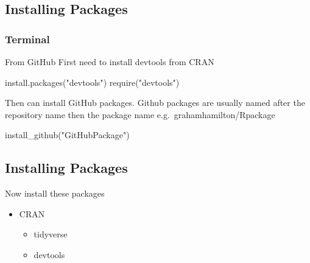 \documentclass[
  letterpaper,
  DIV=11,
  numbers=noendperiod,
  landscape]{scrartcl}
\newenvironment{Shaded}{\begin{snugshade}}{\end{snugshade}}
\newcommand{\FunctionTok}[1]{\textcolor[rgb]{0.28,0.35,0.67}{#1}}
\newcommand{\NormalTok}[1]{\textcolor[rgb]{0.00,0.23,0.31}{#1}}
\newcommand{\StringTok}[1]{\textcolor[rgb]{0.13,0.47,0.30}{#1}}
\begin{document}
\hypertarget{installing-packages-1}{%
\subsection{Installing Packages}\label{installing-packages-1}}

\hypertarget{terminal-1}{%
\subsubsection{Terminal}\label{terminal-1}}

From GitHub First need to install devtools from CRAN

\begin{Shaded}
\begin{Highlighting}[]
\FunctionTok{install.packages}\NormalTok{(}\StringTok{"devtools"}\NormalTok{)}
\FunctionTok{require}\NormalTok{(}\StringTok{"devtools"}\NormalTok{)}
\end{Highlighting}
\end{Shaded}

Then can install GitHub packages. Github packages are usually named
after the repository name then the package name
e.g.~grahamhamilton/Rpackage

\begin{Shaded}
\begin{Highlighting}[]
\FunctionTok{install\_github}\NormalTok{(}\StringTok{"GitHubPackage"}\NormalTok{)}
\end{Highlighting}
\end{Shaded}

\hypertarget{installing-packages-2}{%
\subsection{Installing Packages}\label{installing-packages-2}}

Now install these packages

\begin{itemize}
\item
  CRAN

  \begin{itemize}
  \item
    tidyverse
  \item
    devtools
  \end{itemize}
\end{itemize}

\hypertarget{section-1}{%
\subsection{}\label{section-1}}
\end{document}
